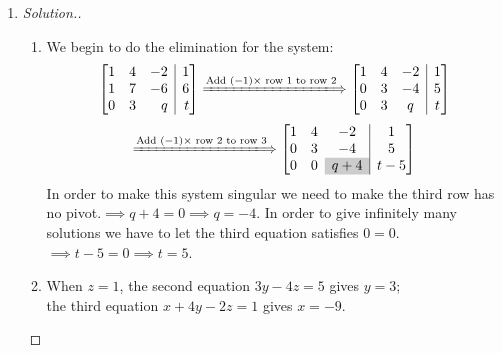 \begin{enumerate}
\begin{proof}
Since the choice of point on the line was arbitrary, we see that every point on the line determined by the two solutions is also a solution, so there are infinitely many solutions to the system
\end{proof}

\item \begin{proof}[Solution.]
\begin{enumerate}
\item
We begin to do the elimination for the system:
\[
\left[
\begin{array}{@{}rrr|r@{}}
1 & 4 & -2 & 1 \\
1 & 7 & -6 & 6 \\
0 & 3 & q & t\\
\end{array}
\right]
\xLongrightarrow{\text{Add $(-1)\times$ row 1 to row 2}}
\left[
\begin{array}{@{}ccc|c@{}}
1 & 4 & -2 & 1 \\
0 & 3 & -4 & 5 \\
0 & 3 & q & t
\end{array}
\right]\]
\[
\xLongrightarrow{\text{Add $(-1)\times$ row 2 to row 3}}
\left[
\begin{array}{@{}ccc|c@{}}
1 & 4 & -2 & 1 \\
0 & 3 & -4 & 5 \\
0 & 0 & \cellcolor{black!20}{q+4} & t-5
\end{array}
\right]
\]
In order to make this system singular we need to make the third row has no pivot.$\implies q+4=0\implies q = -4$. In order to give infinitely many solutions we have to let the third equation satisfies $0=0$. $\implies t-5=0 \implies t=5$.
\item
When $z=1$, the second equation $3y-4z=5$ gives $y=3$; \\ the third equation $x+4y-2z=1$ gives $x=-9$.

\end{enumerate}
\end{proof}


\end{enumerate}
